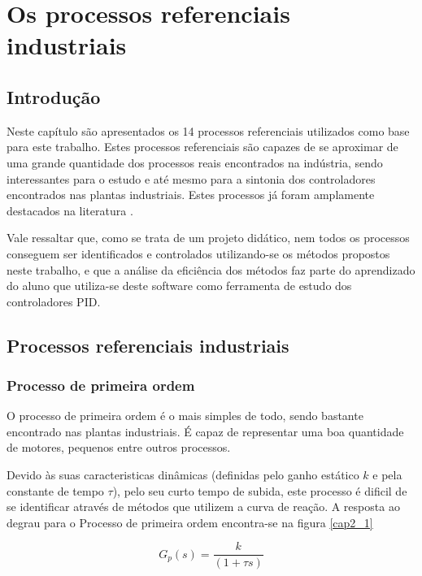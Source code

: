 \chapter{Os processos referenciais industriais
    \label{cap:processos-referenciais}}

\section{Introdução}

Neste capítulo são apresentados os 14 processos referenciais utilizados
como base para este trabalho. Estes processos referenciais são capazes de se
aproximar de uma grande quantidade dos processos reais encontrados na indústria,
sendo interessantes para o estudo e até mesmo para a sintonia dos controladores
encontrados nas plantas industriais. Estes processos já foram amplamente destacados
na literatura \cite{Isermann} \cite{AstromHagglund}.

Vale ressaltar que, como se trata de um projeto didático, nem todos os processos
conseguem ser identificados e controlados utilizando-se os métodos propostos
neste trabalho, e que a análise da eficiência dos métodos faz parte do aprendizado
do aluno que utiliza-se deste software como ferramenta de estudo dos controladores
\acs{PID}.

\section{Processos referenciais industriais}

\subsection{Processo de primeira ordem}
    
    O processo de primeira ordem é o mais simples de todo, sendo bastante encontrado
    nas plantas industriais. É capaz de representar uma boa quantidade de motores,
    pequenos entre outros processos.
    
    Devido às suas caracteristicas dinâmicas (definidas pelo ganho estático $k$ e
    pela constante de tempo $\tau$), pelo seu curto tempo de subida, este processo
    é dificil de se identificar através de métodos que utilizem a curva de reação.
    A resposta ao degrau para o Processo de primeira ordem encontra-se na figura
    \ref{cap2_1}
    
    \begin{equation}
        G_p(s) = \frac{k}{(1+\tau s)}
    \end{equation}
    
